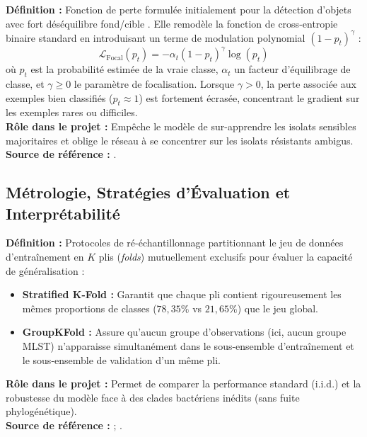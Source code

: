 \documentclass[11pt,a4paper]{article}
\begin{document}
\begin{defbox}
\textbf{Définition :} Fonction de perte formulée initialement pour la détection d'objets avec fort déséquilibre fond/cible \citep{lin2017focal}. Elle remodèle la fonction de cross-entropie binaire standard en introduisant un terme de modulation polynomial $(1 - p_t)^\gamma$ :
\[
\mathcal{L}_{\text{Focal}}(p_t) = -\alpha_t (1 - p_t)^\gamma \log(p_t)
\]
où $p_t$ est la probabilité estimée de la vraie classe, $\alpha_t$ un facteur d'équilibrage de classe, et $\gamma \ge 0$ le paramètre de focalisation. Lorsque $\gamma > 0$, la perte associée aux exemples bien classifiés ($p_t \approx 1$) est fortement écrasée, concentrant le gradient sur les exemples rares ou difficiles.\\
\textbf{Rôle dans le projet :} Empêche le modèle de sur-apprendre les isolats sensibles majoritaires et oblige le réseau à se concentrer sur les isolats résistants ambigus.\\
\textbf{Source de référence :} \citet{lin2017focal}.
\end{defbox}

\subsection{Métrologie, Stratégies d'Évaluation et Interprétabilité}

\begin{defbox}
\textbf{Définition :} Protocoles de ré-échantillonnage partitionnant le jeu de données d'entraînement en $K$ plis (\textit{folds}) mutuellement exclusifs pour évaluer la capacité de généralisation \citep{hastie2009elements} :
\begin{itemize}[leftmargin=*, label=$\bullet$]
    \item \textbf{Stratified K-Fold :} Garantit que chaque pli contient rigoureusement les mêmes proportions de classes ($78,35\%$ vs $21,65\%$) que le jeu global.
    \item \textbf{GroupKFold :} Assure qu'aucun groupe d'observations (ici, aucun groupe MLST) n'apparaisse simultanément dans le sous-ensemble d'entraînement et le sous-ensemble de validation d'un même pli.
\end{itemize}
\textbf{Rôle dans le projet :} Permet de comparer la performance standard (i.i.d.) et la robustesse du modèle face à des clades bactériens inédits (sans fuite phylogénétique).\\
\textbf{Source de référence :} \citet{hastie2009elements} ; \citet{earle2016identifying}.
\end{defbox}
\end{document}
